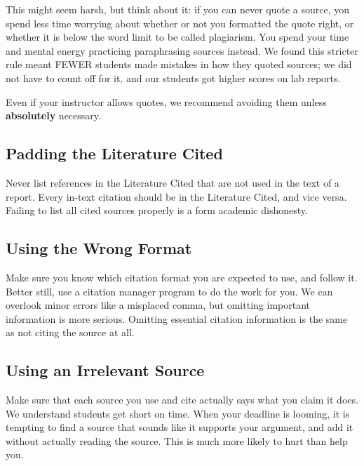 \documentclass[
]{book}
\begin{document}
This might seem harsh, but think about it: if you can never quote a source, you spend less time worrying about whether or not you formatted the quote right, or whether it is below the word limit to be called plagiarism. You spend your time and mental energy practicing paraphrasing sources instead. We found this stricter rule meant FEWER students made mistakes in how they quoted sources; we did not have to count off for it, and our students got higher scores on lab reports.

Even if your instructor allows quotes, we recommend avoiding them unless \textbf{absolutely} necessary.

\hypertarget{padding-the-literature-cited}{%
\subsection{Padding the Literature Cited}\label{padding-the-literature-cited}}

Never list references in the Literature Cited that are not used in the text of a report. Every in-text citation should be in the Literature Cited, and vice versa. Failing to list all cited sources properly is a form academic dishonesty.

\hypertarget{using-the-wrong-format}{%
\subsection{Using the Wrong Format}\label{using-the-wrong-format}}

Make sure you know which citation format you are expected to use, and follow it. Better still, use a citation manager program to do the work for you. We can overlook minor errors like a misplaced comma, but omitting important information is more serious. Omitting essential citation information is the same as not citing the source at all.

\hypertarget{using-an-irrelevant-source}{%
\subsection{Using an Irrelevant Source}\label{using-an-irrelevant-source}}

Make sure that each source you use and cite actually says what you claim it does. We understand students get short on time. When your deadline is looming, it is tempting to find a source that sounds like it supports your argument, and add it without actually reading the source. This is much more likely to hurt than help you.
\end{document}
